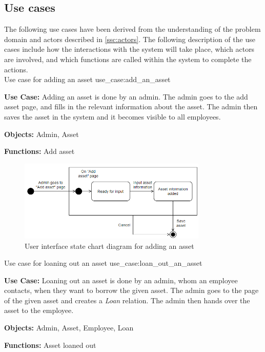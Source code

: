 \subsection{Use cases} \label{ssc:usecases}
The following use cases have been derived from the understanding of the problem domain and actors described in \autoref{ssc:actors}. The following description of the use cases include how the interactions with the system will take place, which actors are involved, and which functions are called within the system to complete the actions. \\

    {Use case for adding an asset}
    {use_case:add_an_asset}
    {
        \textbf{Use Case:} Adding an asset is done by an admin. The admin goes to the add asset page, and fills in the relevant information about the asset. The admin then saves the asset in the system and it becomes visible to all employees.
    
        \vskip 0.2cm
        
        \textbf{Objects:} Admin, Asset
        
        \vskip 0.2cm
        
        \textbf{Functions:} Add asset
    }

\begin{figure}[H]
    \centering
    \includegraphics[width=0.80\textwidth]{figures/UseCases/AddAssetUseCase.png}
    \caption{User interface state chart diagram for adding an asset}
    \label{fig:add_asset_statechart}
\end{figure}


    {Use case for loaning out an asset}
    {use_case:loan_out_an_asset}
    {
        \textbf{Use Case:} Loaning out an asset is done by an admin, whom an employee contacts, when they want to borrow the given asset. The admin goes to the page of the given asset and creates a \textit{Loan} relation. The admin then hands over the asset to the employee.
    
        \vskip 0.2cm
        
        \textbf{Objects:} Admin, Asset, Employee, Loan
        
        \vskip 0.2cm
        
        \textbf{Functions:} Asset loaned out
    }
 
